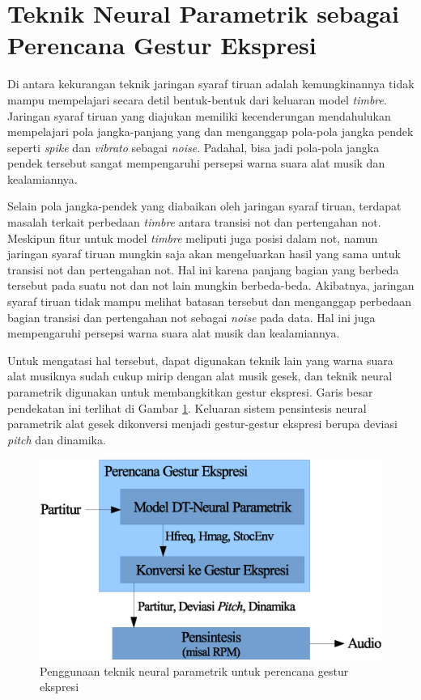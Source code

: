 \section{Teknik Neural Parametrik sebagai Perencana Gestur Ekspresi}

Di antara kekurangan teknik jaringan syaraf tiruan adalah kemungkinannya tidak mampu mempelajari secara detil bentuk-bentuk dari keluaran model \textit{timbre}. Jaringan syaraf tiruan yang diajukan memiliki kecenderungan mendahulukan mempelajari pola jangka-panjang yang dan menganggap pola-pola jangka pendek seperti \textit{spike} dan \textit{vibrato} sebagai \textit{noise}. Padahal, bisa jadi pola-pola jangka pendek tersebut sangat mempengaruhi persepsi warna suara alat musik dan kealamiannya.

Selain pola jangka-pendek yang diabaikan oleh jaringan syaraf tiruan, terdapat masalah terkait perbedaan \textit{timbre} antara transisi not dan pertengahan not. Meskipun fitur untuk model \textit{timbre} meliputi juga posisi dalam not, namun jaringan syaraf tiruan mungkin saja akan mengeluarkan hasil yang sama untuk transisi not dan pertengahan not. Hal ini karena panjang bagian yang berbeda tersebut pada suatu not dan not lain mungkin berbeda-beda. Akibatnya, jaringan syaraf tiruan tidak mampu melihat batasan tersebut dan menganggap perbedaan bagian transisi dan pertengahan not sebagai \textit{noise} pada data. Hal ini juga mempengaruhi persepsi warna suara alat musik dan kealamiannya.

Untuk mengatasi hal tersebut, dapat digunakan teknik lain yang warna suara alat musiknya sudah cukup mirip dengan alat musik gesek, dan teknik neural parametrik digunakan untuk membangkitkan gestur ekspresi. Garis besar pendekatan ini terlihat di Gambar \ref{fig-dtnp-as-gesture-planner}. Keluaran sistem pensintesis neural parametrik alat gesek dikonversi menjadi gestur-gestur ekspresi berupa deviasi \textit{pitch} dan dinamika.

\begin{figure}[htb]
  \centering
  \includegraphics[width=\textwidth]{resources/DTNP-as-gesture-planner.eps}
  \caption{Penggunaan teknik neural parametrik untuk perencana gestur ekspresi}\label{fig-dtnp-as-gesture-planner}
\end{figure}

